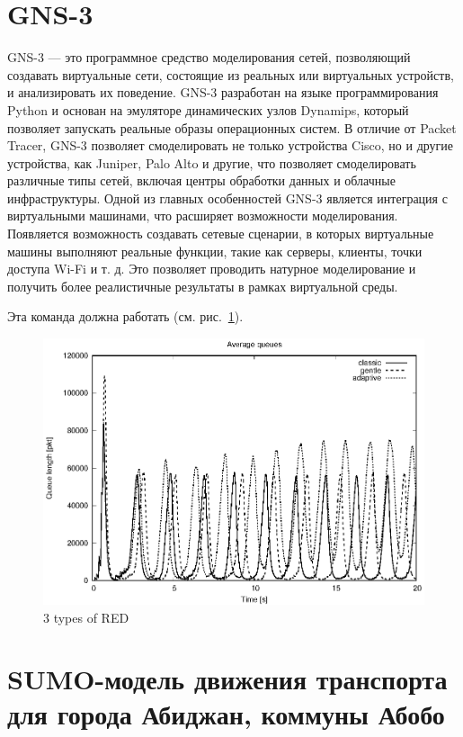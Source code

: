 \section{GNS-3}
GNS-3 — это программное средство моделирования сетей, позволяющий создавать виртуальные сети, состоящие из реальных или виртуальных устройств, и анализировать их поведение. GNS-3 разработан на языке программирования Python и основан на эмуляторе динамических узлов Dynamips, который позволяет запускать реальные образы операционных систем. В отличие от Packet Tracer, GNS-3 позволяет смоделировать не только устройства Cisco, но и другие устройства, как Juniper, Palo Alto и другие, что позволяет смоделировать различные типы сетей, включая центры обработки данных и облачные инфраструктуры. Одной из главных особенностей GNS-3 является интеграция с виртуальными машинами, что расширяет возможности моделирования. Появляется возможность создавать сетевые сценарии, в которых виртуальные машины выполняют реальные функции, такие как серверы, клиенты, точки доступа Wi-Fi и т. д. Это позволяет проводить натурное моделирование и получить более реалистичные результаты в рамках виртуальной среды.



Эта команда должна работать (см. рис.~\ref{fig:1.1}).


\begin{figure}[!h]
  \centering
  \includegraphics[width=0.9\linewidth]{image/av_queues_3types.eps}
  \caption{3 types of RED}
  \label{fig:1.1}
\end{figure}



\section{SUMO-модель движения транспорта для города Абиджан, коммуны Абобо}


